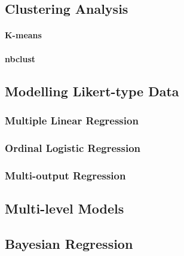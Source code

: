 \subsection{Clustering Analysis}
\paragraph{K-means}
\paragraph{nbclust}

\subsection{Modelling Likert-type Data}

\subsubsection{Multiple Linear Regression}

\subsubsection{Ordinal Logistic Regression}

\subsubsection{Multi-output Regression}

\subsection{Multi-level Models}

\subsection{Bayesian Regression}


